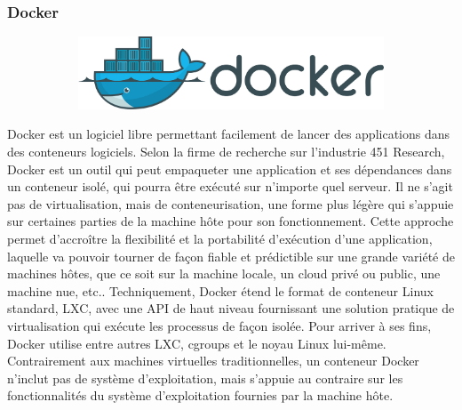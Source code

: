 \documentclass{article}
\begin{document}
\subsubsection{Docker}

\begin{figure}[h!]
	\centering
  	\begin{subfigure}[b]{1.0\linewidth}
	\includegraphics[width=\linewidth]{docker.png}
  	\end{subfigure}
\end{figure}

Docker est un logiciel libre permettant facilement de lancer des applications dans des conteneurs logiciels.
\newline
Selon la firme de recherche sur l'industrie 451 Research, Docker est un outil qui peut empaqueter une application et ses dépendances dans un conteneur isolé, qui pourra être exécuté sur n'importe quel serveur. Il ne s'agit pas de virtualisation, mais de conteneurisation, une forme plus légère qui s'appuie sur certaines parties de la machine hôte pour son fonctionnement. Cette approche permet d'accroître la flexibilité et la portabilité d’exécution d'une application, laquelle va pouvoir tourner de façon fiable et prédictible sur une grande variété de machines hôtes, que ce soit sur la machine locale, un cloud privé ou public, une machine nue, etc..
\newline
Techniquement, Docker étend le format de conteneur Linux standard, LXC, avec une API de haut niveau fournissant une solution pratique de virtualisation qui exécute les processus de façon isolée. Pour arriver à ses fins, Docker utilise entre autres LXC, cgroups et le noyau Linux lui-même. Contrairement aux machines virtuelles traditionnelles, un conteneur Docker n'inclut pas de système d'exploitation, mais s'appuie au contraire sur les fonctionnalités du système d’exploitation fournies par la machine hôte.
\end{document}
